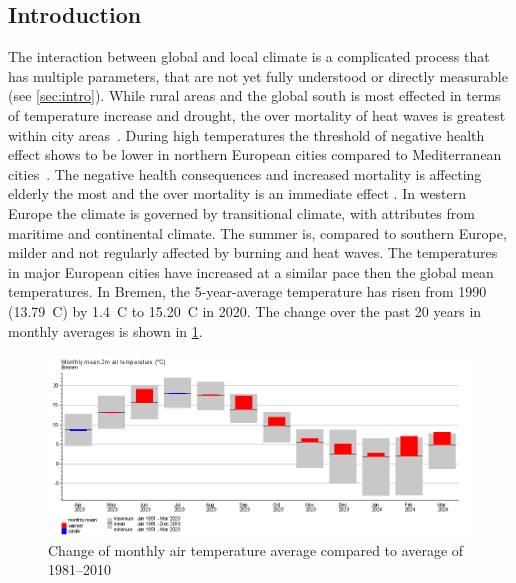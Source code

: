 \documentclass[12pt,a4paper, english,twoside]{scrartcl}
\begin{document}
    \subsection{Introduction}
      The interaction between global and local climate is a complicated process that has multiple parameters, that are not yet fully understood or directly measurable (see \cref{sec:intro}).  
      While rural areas and the global south is most effected in terms of temperature increase and drought, the over mortality of heat waves is greatest within city areas~\autocite{Gabriel2011}. During high temperatures the threshold of negative health effect shows to be lower in northern European cities compared to Mediterranean cities~\autocite{Baccini2008}. 
      The negative health consequences and increased mortality is affecting elderly the most and the over mortality is an immediate effect \autocite{Baccini2008}. 
      In western Europe the climate is governed by transitional climate, with attributes from maritime and continental climate.
      The summer is, compared to southern Europe, milder and not regularly affected by burning and heat waves. 
      The temperatures in major European cities have increased at a similar pace then the global mean temperatures. 
      In Bremen, the 5-year-average temperature has risen from 1990 (13.79\textdegree\ C)  by 1.4\textdegree\ C to 15.20\textdegree\ C in 2020.
      The change over the past 20 years in monthly averages is shown in \cref{fig:monthAvg}.
      \begin{figure}[!htbp]
          \centering
          \includegraphics[width=\textwidth]{img/BremenClimateAvgDiff2023.png}
          \caption{Change of monthly air temperature average compared to average of 1981--2010~\autocite{DWD2024a}\label{fig:monthAvg}}
      \end{figure}
\end{document}
